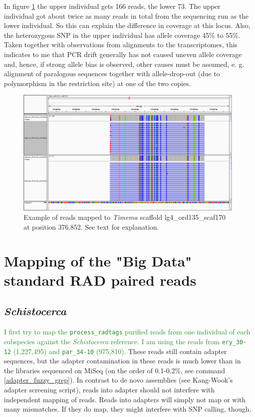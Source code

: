 \documentclass{article}\usepackage[]{graphicx}\usepackage[]{color}
\newcommand{\roger}[1]{ \textcolor[named]{ForestGreen}{#1} }
\begin{document}
In figure \ref{igv_lg4_ord135_scaf170} the upper individual gets 166 reads, the lower 73. The upper individual got about twice as many reads in total from the sequencing run as the lower individual. So this can explain the difference in coverage at this locus. Also, the heterozygous SNP in the upper individual has allele coverage 45\% to 55\%. Taken together with observations from alignments to the transcriptomes, this indicates to me that  PCR drift generally has not caused uneven allele coverage and, hence, if strong allele bias is observed, other causes must be assumed, e. g. alignment of paralogous sequences together with allele-drop-out (due to polymorphism in the restriction site) at one of the two copies.

\begin{figure}
\centering
\includegraphics[width=\textwidth]{./figure/igv_lg4_ord135_scaf170}
\caption{Example of reads mapped to \textit{Timema} scaffold lg4\_ord135\_scaf170 at position 376,852. See text for explanation.}
\label{igv_lg4_ord135_scaf170}
\end{figure}


\section{Mapping of the "Big Data" standard RAD paired reads}

\subsection{\textit{Schistocerca}}

\roger{I first try to map the \texttt{process\_radtags} purified reads from one individual of each subspecies against the \textit{Schistocerca} reference. I am using the reads from \texttt{ery\_30-12} (1,227,495) and \texttt{par\_34-10} (975,810).} These reads still contain adapter sequences, but the adapter contamination in these reads is much lower than in the libraries sequenced on MiSeq (on the order of 0.1-0.2\%, see command \ref{adapter_fuzzy_grep}). In contrast to de novo assemblies (see Kang-Wook's adapter screening script), reads into adapter should not interfere with independent mapping of reads. Reads into adapters will simply not map or with many mismatches. If they do map, they might interfere with SNP calling, though.
\end{document}
